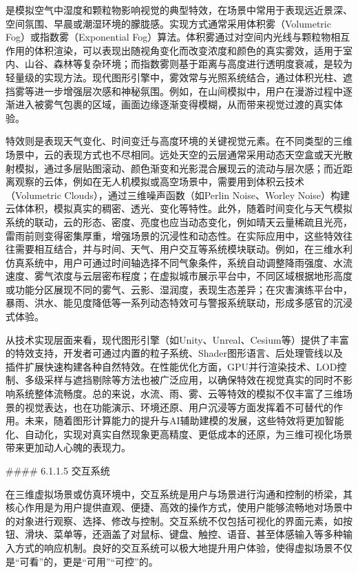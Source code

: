 是模拟空气中湿度和颗粒物影响视觉的典型特效，在场景中常用于表现远近景深、空间氛围、早晨或潮湿环境的朦胧感。实现方式通常采用体积雾（Volumetric Fog）或指数雾（Exponential Fog）算法。体积雾通过对空间内光线与颗粒物相互作用的体积渲染，可以表现出随视角变化而改变浓度和颜色的真实雾效，适用于室内、山谷、森林等复杂环境；而指数雾则基于距离与高度进行透明度衰减，是较为轻量级的实现方法。现代图形引擎中，雾效常与光照系统结合，通过体积光柱、遮挡雾等进一步增强层次感和神秘氛围。例如，在山间模拟中，用户在漫游过程中逐渐进入被雾气包裹的区域，画面边缘逐渐变得模糊，从而带来视觉过渡的真实体验。

特效则是表现天气变化、时间变迁与高度环境的关键视觉元素。在不同类型的三维场景中，云的表现方式也不尽相同。远处天空的云层通常采用动态天空盒或天光散射模拟，通过多层贴图滚动、颜色渐变和光影混合展现云的流动与层次感；而近距离观察的云体，例如在无人机模拟或高空场景中，需要用到体积云技术（Volumetric Clouds），通过三维噪声函数（如Perlin Noise、Worley Noise）构建云体体积，模拟真实的稠密、透光、变化等特性。此外，随着时间变化与天气模拟系统的联动，云的形态、密度、亮度也应当动态变化，例如晴天云量稀疏且光亮，雷雨前则变得密集厚重，增强场景的沉浸性和动态性。在实际应用中，这些特效往往需要相互结合，并与时间、天气、用户交互等系统模块联动。例如，在三维水利仿真系统中，用户可通过时间轴选择不同气象条件，系统自动调整降雨强度、水流速度、雾气浓度与云层密布程度；在虚拟城市展示平台中，不同区域根据地形高度或功能分区展现不同的雾气、云影、湿润度，表现生态差异；在灾害演练平台中，暴雨、洪水、能见度降低等一系列动态特效可与警报系统联动，形成多感官的沉浸式体验。

从技术实现层面来看，现代图形引擎（如Unity、Unreal、Cesium等）提供了丰富的特效支持，开发者可通过内置的粒子系统、Shader图形语言、后处理管线以及插件扩展快速构建各种自然特效。在性能优化方面，GPU并行渲染技术、LOD控制、多级采样与遮挡剔除等方法也被广泛应用，以确保特效在视觉真实的同时不影响系统整体流畅度。总的来说，水流、雨、雾、云等特效的模拟不仅丰富了三维场景的视觉表达，也在功能演示、环境还原、用户沉浸等方面发挥着不可替代的作用。未来，随着图形计算能力的提升与AI辅助建模的发展，这些特效将更加智能化、自动化，实现对真实自然现象更高精度、更低成本的还原，为三维可视化场景带来更加动人心魄的表现力。

\#\#\#\# 6.1.1.5 交互系统

在三维虚拟场景或仿真环境中，交互系统是用户与场景进行沟通和控制的桥梁，其核心作用是为用户提供直观、便捷、高效的操作方式，使用户能够流畅地对场景中的对象进行观察、选择、修改与控制。交互系统不仅包括可视化的界面元素，如按钮、滑块、菜单等，还涵盖了对鼠标、键盘、触控、语音、甚至体感输入等多种输入方式的响应机制。良好的交互系统可以极大地提升用户体验，使得虚拟场景不仅是``可看''的，更是``可用''``可控''的。

